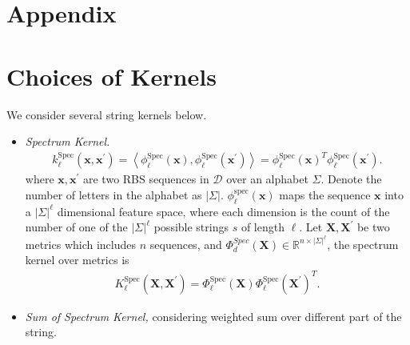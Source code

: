 \section*{Appendix}

\section{Choices of Kernels}

We consider several string kernels below.

\begin{itemize}
    \item \textit{Spectrum Kernel.}
    \begin{align}
        k_\ell^{\text{Spec}}(\textbf{x}, \textbf{x}^\prime) =\left\langle\phi_{\ell}^{\mathrm{Spec}}(\mathbf{x}), \phi_{\ell}^{\mathrm{Spec}}\left(\mathbf{x}^{\prime}\right)\right\rangle = \phi_{\ell}^{\mathrm{Spec}}(\mathbf{x})^T \phi_{\ell}^{\mathrm{Spec}}\left(\mathbf{x}^{\prime}\right).
    \end{align}
     where $\mathbf{x}, \mathbf{x}^\prime$ are two RBS sequences in $\mathcal{D}$ over an alphabet $\Sigma$. Denote the number of letters in the alphabet as $|\Sigma|$. 
    $\phi_{\ell}^{\mathrm{spec}}(\mathbf{x})$ maps the sequence $\textbf{x}$ into a $|\Sigma|^\ell$ dimensional feature space, where each dimension is the count of the number of one of the $|\Sigma|^\ell$ possible strings $s$ of length $\ell$.  Let $\mathbf{X}, \mathbf{X}^\prime$ be two metrics which includes $n$ sequences, and $\Phi_d^{Spec}(\mathbf{X}) \in \mathbb{R}^{n \times |\Sigma|^{\ell}}$, the spectrum kernel over metrics is 
    \begin{align}
         K_\ell^{\text{Spec}}(\textbf{X}, \textbf{X}^\prime) = \Phi_{\ell}^{\mathrm{Spec}}(\mathbf{X}) \Phi_{\ell}^{\mathrm{Spec}}\left(\mathbf{X}^{\prime}\right)^T.
    \end{align}
    
    \item \textit{Sum of Spectrum Kernel,} considering weighted sum over different part of the string. 
    

\end{itemize}
